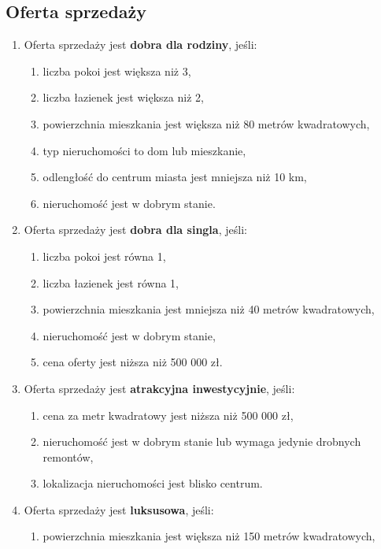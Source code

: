 \subsection{Oferta sprzedaży}
\begin{enumerate}[label=S\arabic*.]
    \item Oferta sprzedaży jest \textbf{dobra dla rodziny}, jeśli:
    \begin{enumerate}[label=\arabic*.]
        \item liczba pokoi jest większa niż 3,
        \item liczba łazienek jest większa niż 2,
        \item powierzchnia mieszkania jest większa niż 80 metrów kwadratowych,
        \item typ nieruchomości to dom lub mieszkanie,
        \item odlengłość do centrum miasta jest mniejsza niż 10 km,
        \item nieruchomość jest w dobrym stanie.
    \end{enumerate}
    \item Oferta sprzedaży jest \textbf{dobra dla singla}, jeśli:
    \begin{enumerate}[label=\arabic*.]
        \item liczba pokoi jest równa 1,
        \item liczba łazienek jest równa 1,
        \item powierzchnia mieszkania jest mniejsza niż 40 metrów kwadratowych,
        \item nieruchomość jest w dobrym stanie,
        \item cena oferty jest niższa niż 500 000 zł.
    \end{enumerate}
    \item Oferta sprzedaży jest \textbf{atrakcyjna inwestycyjnie}, jeśli:
    \begin{enumerate}[label=\arabic*.]
        \item cena za metr kwadratowy jest niższa niż 500 000 zł,
        \item nieruchomość jest w dobrym stanie lub wymaga jedynie drobnych remontów,
        \item lokalizacja nieruchomości jest blisko centrum.
    \end{enumerate}
    \item Oferta sprzedaży jest \textbf{luksusowa}, jeśli:
    \begin{enumerate}[label=\arabic*.]
        \item powierzchnia mieszkania jest większa niż 150 metrów kwadratowych,

\end{enumerate}
\end{enumerate}
